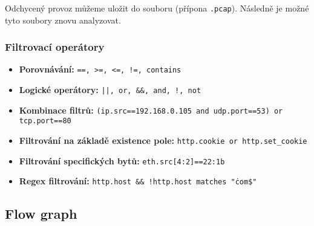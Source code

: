 Odchycený provoz můžeme uložit do souboru (přípona \texttt{.pcap}). Následně je možné tyto soubory znovu analyzovat.


\subsubsection{Filtrovací operátory}
\begin{itemize}
\item \textbf{Porovnávání:} \texttt{==, >=, <=, !=, contains}
\item \textbf{Logické operátory:} \texttt{||, or, \&\&, and, !, not}
\item \textbf{Kombinace filtrů:} \texttt{(ip.src==192.168.0.105 and udp.port==53) or tcp.port==80}
\item \textbf{Filtrování na základě existence pole:} \texttt{http.cookie or http.set\_cookie}
\item \textbf{Filtrování specifických bytů:} \texttt{eth.src[4:2]==22:1b}
\item \textbf{Regex filtrování:} \texttt{http.host \&\& !http.host matches "\.com\$"}
\end{itemize}

\subsection{Flow graph}
